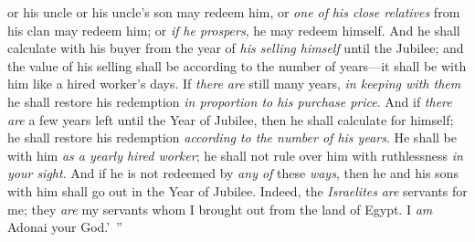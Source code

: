 \begin{biblechapter}
\verse or his uncle or his uncle’s son may redeem him, or \textit{one of} \textit{his close relatives} from his clan may redeem him; or \textit{if} \textit{he prospers}, he may redeem himself.
\verse And he shall calculate with his buyer from the year of \textit{his selling himself} until the Jubilee; and the value of his selling shall be according to the number of years—it shall be with him like a hired worker’s days.
\verse If \textit{there are} still many years, \textit{in keeping with them} he shall restore his redemption \textit{in proportion to his purchase price}.
\verse And if \textit{there are} a few years left until the Year of Jubilee, then he shall calculate for himself; he shall restore his redemption \textit{according to the number of his years}.
\verse He shall be with him \textit{as a yearly hired worker}; he shall not rule over him with ruthlessness \textit{in your sight}.
\verse And if he is not redeemed by \textit{any of} these \textit{ways}, then he and his sons with him shall go out in the Year of Jubilee.
\verse Indeed, the \textit{Israelites} \textit{are} servants for me; they \textit{are} my servants whom I brought out from the land of Egypt. I \textit{am} Adonai your God.’ ”
\end{biblechapter}

